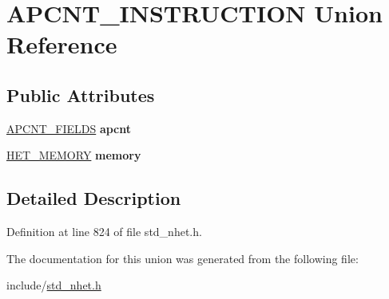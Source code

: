 \hypertarget{unionAPCNT__INSTRUCTION}{}\section{A\+P\+C\+N\+T\+\_\+\+I\+N\+S\+T\+R\+U\+C\+T\+I\+ON Union Reference}
\label{unionAPCNT__INSTRUCTION}
\subsection*{Public Attributes}
\begin{DoxyCompactItemize}
\item 
\mbox{\label{unionAPCNT__INSTRUCTION_aa2df4b1ec94004a8764df54b9d2f17ef}} 
\mbox{\hyperlink{structapcnt__format}{A\+P\+C\+N\+T\+\_\+\+F\+I\+E\+L\+DS}} {\bfseries apcnt}
\item 
\mbox{\label{unionAPCNT__INSTRUCTION_a432be48de256be8afd6509b343632752}} 
\mbox{\hyperlink{structmemory__format}{H\+E\+T\+\_\+\+M\+E\+M\+O\+RY}} {\bfseries memory}
\end{DoxyCompactItemize}


\subsection{Detailed Description}


Definition at line 824 of file std\+\_\+nhet.\+h.



The documentation for this union was generated from the following file\+:\begin{DoxyCompactItemize}
\item 
include/\mbox{\hyperlink{std__nhet_8h}{std\+\_\+nhet.\+h}}\end{DoxyCompactItemize}
